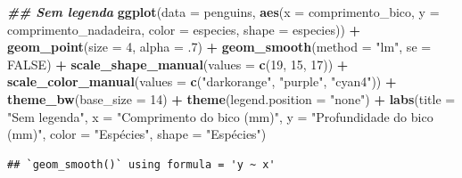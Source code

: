 \documentclass[
]{article}
\newenvironment{Shaded}{\begin{snugshade}}{\end{snugshade}}
\newcommand{\AttributeTok}[1]{\textcolor[rgb]{0.13,0.29,0.53}{#1}}
\newcommand{\ConstantTok}[1]{\textcolor[rgb]{0.56,0.35,0.01}{#1}}
\newcommand{\DecValTok}[1]{\textcolor[rgb]{0.00,0.00,0.81}{#1}}
\newcommand{\DocumentationTok}[1]{\textcolor[rgb]{0.56,0.35,0.01}{\textbf{\textit{#1}}}}
\newcommand{\FunctionTok}[1]{\textcolor[rgb]{0.13,0.29,0.53}{\textbf{#1}}}
\newcommand{\NormalTok}[1]{#1}
\newcommand{\SpecialCharTok}[1]{\textcolor[rgb]{0.81,0.36,0.00}{\textbf{#1}}}
\newcommand{\StringTok}[1]{\textcolor[rgb]{0.31,0.60,0.02}{#1}}
\begin{document}
\begin{Shaded}
\begin{Highlighting}[]
\DocumentationTok{\#\# Sem legenda}
\FunctionTok{ggplot}\NormalTok{(}\AttributeTok{data =}\NormalTok{ penguins, }
       \FunctionTok{aes}\NormalTok{(}\AttributeTok{x =}\NormalTok{ comprimento\_bico,  }\AttributeTok{y =}\NormalTok{ comprimento\_nadadeira,}
           \AttributeTok{color =}\NormalTok{ especies, }\AttributeTok{shape =}\NormalTok{ especies)) }\SpecialCharTok{+}
    \FunctionTok{geom\_point}\NormalTok{(}\AttributeTok{size =} \DecValTok{4}\NormalTok{, }\AttributeTok{alpha =}\NormalTok{ .}\DecValTok{7}\NormalTok{) }\SpecialCharTok{+}
    \FunctionTok{geom\_smooth}\NormalTok{(}\AttributeTok{method =} \StringTok{"lm"}\NormalTok{, }\AttributeTok{se =} \ConstantTok{FALSE}\NormalTok{) }\SpecialCharTok{+}
    \FunctionTok{scale\_shape\_manual}\NormalTok{(}\AttributeTok{values =} \FunctionTok{c}\NormalTok{(}\DecValTok{19}\NormalTok{, }\DecValTok{15}\NormalTok{, }\DecValTok{17}\NormalTok{)) }\SpecialCharTok{+}
    \FunctionTok{scale\_color\_manual}\NormalTok{(}\AttributeTok{values =} \FunctionTok{c}\NormalTok{(}\StringTok{"darkorange"}\NormalTok{, }\StringTok{"purple"}\NormalTok{, }\StringTok{"cyan4"}\NormalTok{)) }\SpecialCharTok{+}
    \FunctionTok{theme\_bw}\NormalTok{(}\AttributeTok{base\_size =} \DecValTok{14}\NormalTok{) }\SpecialCharTok{+}
    \FunctionTok{theme}\NormalTok{(}\AttributeTok{legend.position =} \StringTok{"none"}\NormalTok{) }\SpecialCharTok{+}
    \FunctionTok{labs}\NormalTok{(}\AttributeTok{title =} \StringTok{"Sem legenda"}\NormalTok{, }\AttributeTok{x =} \StringTok{"Comprimento do bico (mm)"}\NormalTok{, }
         \AttributeTok{y =} \StringTok{"Profundidade do bico (mm)"}\NormalTok{, }\AttributeTok{color =} \StringTok{"Espécies"}\NormalTok{, }\AttributeTok{shape =} \StringTok{"Espécies"}\NormalTok{)}
\end{Highlighting}
\end{Shaded}

\begin{verbatim}
## `geom_smooth()` using formula = 'y ~ x'
\end{verbatim}
\end{document}
